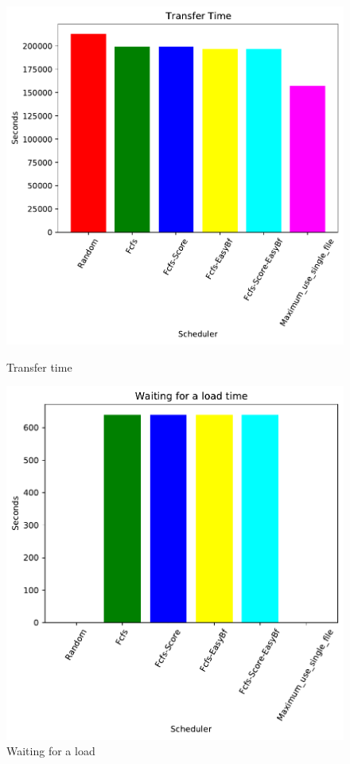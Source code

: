 \documentclass[a4paper]{article}
\begin{document}
	\begin{figure}[H] 
	\begin{minipage}[b]{0.5\linewidth}\centering\includegraphics[width=1\linewidth]{MBSS/plot/2021-05-23-800_Transfer_time4nodes.pdf}\caption{Transfer time}\vspace{4ex}\end{minipage}
	\begin{minipage}[b]{0.5\linewidth}\centering\includegraphics[width=1\linewidth]{MBSS/plot/2021-05-23-800_Waiting_for_a_load_time4nodes.pdf}\caption{Waiting for a load}\vspace{4ex}\end{minipage} 

\end{figure}
\end{document}

